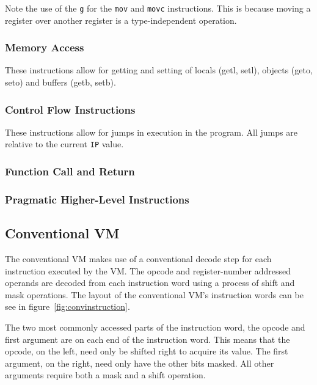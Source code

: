 \documentclass[english,a4paper]{article}
\begin{document}
Note the use of the \verb|g| for the \verb|mov| and \verb|movc| instructions. This is because moving a register over another register is a type-independent operation. 

\subsubsection{Memory Access}
These instructions allow for getting and setting of locals (getl,
setl), objects (geto, seto) and buffers (getb, setb).


\subsubsection{Control Flow Instructions}

These instructions allow for jumps in execution in the program. All
jumps are relative to the current \verb|IP| value.



\subsubsection{Function Call and Return}


\subsubsection{Pragmatic Higher-Level Instructions}

\subsection{Conventional VM}

The conventional VM makes use of a conventional decode step for each
instruction executed by the VM. The opcode and register-number
addressed operands are decoded from each instruction word using a
process of shift and mask operations. The layout of the conventional
VM's instruction words can be see in figure~\ref{fig:convinstruction}.

The two most commonly accessed parts of the instruction word, the
opcode and first argument are on each end of the instruction
word. This means that the opcode, on the left, need only be shifted
right to acquire its value. The first argument, on the right, need
only have the other bits masked. All other arguments require both a
mask and a shift operation.
\end{document}
